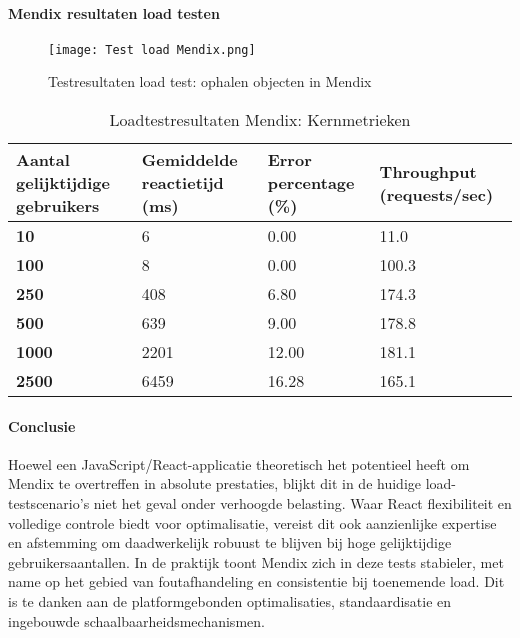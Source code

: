 \paragraph{Mendix resultaten load testen}

\begin{figure}[H]
    \centering
    \texttt{[image: Test load Mendix.png]}
    \caption[\centering Testresultaten load test: ophalen objecten in Mendix]{\label{fig:loadtest-Mendix} Testresultaten load test: ophalen objecten in Mendix}
\end{figure}


\begin{table}[h]
    \centering
    \begin{tabular}{ |p{5cm}|p{3cm}|p{3cm}|p{3cm}|}
        \hline
        \textbf{Aantal gelijktijdige \newline gebruikers} & \textbf{Gemiddelde reactietijd (ms)} & \textbf{Error \newline percentage (\%)} & \textbf{Throughput (requests/sec)}\\
        \hline
        \textbf{10}  & 6 & 0.00 & 11.0 \\
        \hline
        \textbf{100} & 8 & 0.00 & 100.3 \\
        \hline
        \textbf{250}  & 408 & 6.80 & 174.3 \\
        \hline
        \textbf{500}  & 639 & 9.00 & 178.8 \\
        \hline                       
        \textbf{1000}  & 2201 & 12.00 & 181.1  \\
        \hline
        \textbf{2500}  & 6459 & 16.28 & 165.1 \\
        \hline
    \end{tabular}
    \caption[\centering Loadtestresultaten Mendix: Kernmetrieken]{\label{tab:Testresultaten Mendix loadtest}Loadtestresultaten Mendix: Kernmetrieken}
\end{table}



\paragraph{Conclusie}
Hoewel een JavaScript/React-applicatie theoretisch het potentieel heeft om Mendix te overtreffen in absolute prestaties, blijkt dit in de huidige load-testscenario’s niet het geval onder verhoogde belasting. Waar React flexibiliteit en volledige controle biedt voor optimalisatie, vereist dit ook aanzienlijke expertise en afstemming om daadwerkelijk robuust te blijven bij hoge gelijktijdige gebruikersaantallen. In de praktijk toont Mendix zich in deze tests stabieler, met name op het gebied van foutafhandeling en consistentie bij toenemende load. Dit is te danken aan de platformgebonden optimalisaties, standaardisatie en ingebouwde schaalbaarheidsmechanismen.

